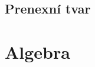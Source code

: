 \documentclass[12pt,a4paper,notitlepage,final]{article}
\begin{document}
\subsection{Prenexní tvar}                  

\section{Algebra}
\end{document}
